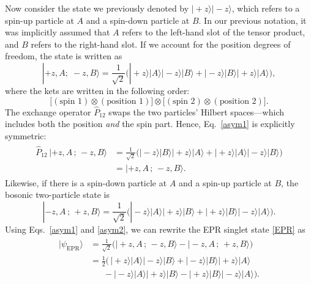 \documentclass[pra,12pt]{revtex4-2}
\begin{document}
Now consider the state we previously denoted by $|\!+\!z\rangle
|\!-\!z\rangle$, which refers to a spin-up particle at $A$ and a
spin-down particle at $B$.  In our previous notation, it was
implicitly assumed that $A$ refers to the left-hand slot of the tensor
product, and $B$ refers to the right-hand slot.  If we account for the
position degrees of freedom, the state is written as
\begin{equation}
  |+\!z, A;\; -z, B\rangle = \frac{1}{\sqrt{2}}
  \Big(|\!+\!z\rangle|A\rangle |\!-\!z\rangle|B\rangle
  + |\!-\!z\rangle|B\rangle |\!+\!z\rangle|A\rangle \Big),
  \label{asym1}
\end{equation}
where the kets are written in the following order:
\begin{equation}
  \Big[
    (\textrm{spin 1}) \otimes (\textrm{position 1}) \Big]
  \otimes
  \Big[
    (\textrm{spin 2}) \otimes (\textrm{position 2}) \Big].
  \label{order1}
\end{equation}
The exchange operator $\hat{P}_{12}$ swaps the two particles' Hilbert
spaces---which includes both the position \textit{and} the spin part.
Hence, Eq.~\eqref{asym1} is explicitly symmetric:
\begin{align}
  \begin{aligned}
  \hat{P}_{12} \, |+\!z, A\,;\, -z, B\rangle &= \frac{1}{\sqrt{2}}
  \Big(|\!-\!z\rangle|B\rangle |\!+\!z\rangle|A\rangle
  + |\!+\!z\rangle|A\rangle |\!-\!z\rangle|B\rangle \Big) \\
  &= |+\!z, A\,;\, -z, B\rangle.
  \end{aligned}
\end{align}
Likewise, if there is a spin-down particle at $A$ and a spin-up
particle at $B$, the bosonic two-particle state is
\begin{equation}
  |-\!z, A\,;\, +z, B\rangle = \frac{1}{\sqrt{2}}
  \Big(|\!-\!z\rangle|A\rangle |\!+\!z\rangle|B\rangle
  + |\!+\!z\rangle|B\rangle |\!-\!z\rangle|A\rangle \Big).
  \label{asym2}
\end{equation}
Using Eqs.~\eqref{asym1} and \eqref{asym2}, we can rewrite the EPR
singlet state \eqref{EPR} as
\begin{align}
  \begin{aligned}
    |\psi_{\mathrm{EPR}}\rangle &= \frac{1}{\sqrt{2}} \Big(
    |\!+\!z, A\,;\, -z, B\rangle - |-\!z, A\,;\, +z, B\rangle \Big)\\
    &= \frac{1}{2} \Big(\,
    |\!+\!z\rangle|A\rangle |\!-\!z\rangle|B\rangle
    + |\!-\!z\rangle|B\rangle |\!+\!z\rangle|A\rangle \\
    &\quad\;\;- |\!-\!z\rangle|A\rangle |\!+\!z\rangle|B\rangle
    - |\!+\!z\rangle|B\rangle |\!-\!z\rangle|A\rangle \Big).
    \label{epr1}
  \end{aligned}
\end{align}
\end{document}
